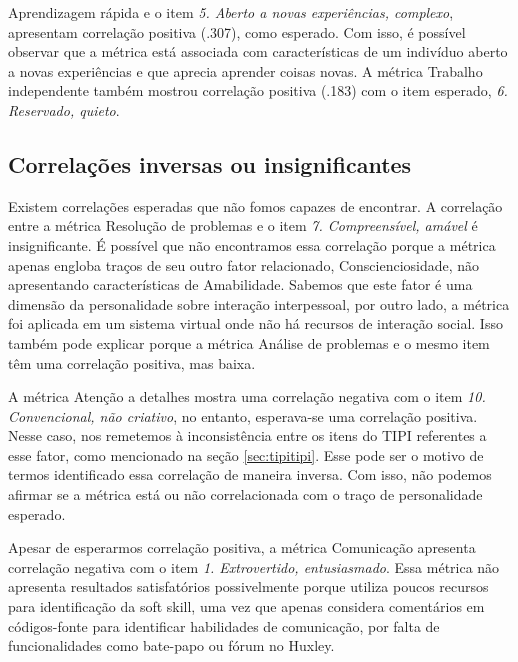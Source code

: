 Aprendizagem rápida e o item \textit{5. Aberto a novas experiências, complexo}, apresentam correlação positiva (.307), como esperado. Com isso, é possível observar que a métrica está associada com características de um indivíduo aberto a novas experiências e que aprecia aprender coisas novas. A métrica Trabalho independente também mostrou correlação positiva (.183) com o item esperado, \textit{6. Reservado, quieto}.

\subsection{Correlações inversas ou insignificantes}

Existem correlações esperadas que não fomos capazes de encontrar. A correlação entre a métrica Resolução de problemas e o item \textit{7. Compreensível, amável} é insignificante. É possível que não encontramos essa correlação porque a métrica apenas engloba traços de seu outro fator relacionado, Conscienciosidade, não apresentando características de Amabilidade. Sabemos que este fator é uma dimensão da personalidade sobre interação interpessoal, por outro lado, a métrica foi aplicada em um sistema virtual onde não há recursos de interação social. Isso também pode explicar porque a métrica Análise de problemas e o mesmo item têm uma correlação positiva, mas baixa.

A métrica Atenção a detalhes mostra uma correlação negativa com o item
\textit{10. Convencional, não criativo}, no entanto, esperava-se uma correlação positiva.
Nesse caso, nos remetemos à inconsistência entre os itens do TIPI referentes a esse fator, como mencionado na seção \ref{sec:tipitipi}.
Esse pode ser o motivo de termos identificado essa correlação de maneira inversa.
Com isso, não podemos afirmar se a métrica está ou não correlacionada com o traço de personalidade esperado.

Apesar de esperarmos correlação positiva, a métrica Comunicação apresenta correlação negativa com o item \textit{1. Extrovertido, entusiasmado}.
Essa métrica não apresenta resultados satisfatórios possivelmente porque utiliza poucos recursos para identificação da soft skill,
uma vez que apenas considera comentários em códigos-fonte para identificar habilidades de comunicação,
por falta de funcionalidades como bate-papo ou fórum no Huxley.

